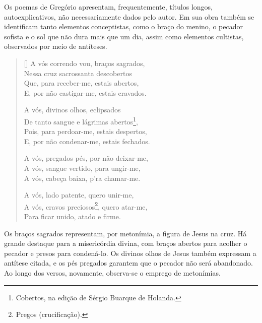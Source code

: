 \documentclass[12pt]{book}
\begin{document}
			\par Os poemas de Gregório apresentam, frequentemente, títulos longos, autoexplicativos, não necessariamente dados pelo autor. Em sua obra também se identificam tanto elementos conceptistas, como o braço do menino, o pecador sofista e o sol que não dura mais que um dia, assim como elementos cultistas, observados por meio de antíteses.
			\settowidth{\versewidth}{Nessa cruz sacrossanta descobertos}
			\begin{verse}[\versewidth]
				A vós correndo vou, braços sagrados, \\
				Nessa cruz sacrossanta descobertos \\
				Que, para receber-me, estais abertos, \\
				E, por não castigar-me, estais cravados.

				A vós, divinos olhos, eclipsados \\
				De tanto sangue e lágrimas abertos\footnote{Cobertos, na edição de Sérgio Buarque de Holanda.}, \\
				Pois, para perdoar-me, estais despertos, \\
				E, por não condenar-me, estais fechados.
				
				A vós, pregados pés, por não deixar-me, \\
				A vós, sangue vertido, para ungir-me, \\
				A vós, cabeça baixa, p'ra chamar-me.
				
				A vós, lado patente, quero unir-me, \\
				A vós, cravos preciosos\footnote{Pregos (crucificação).}, quero atar-me, \\
				Para ficar unido, atado e firme. \\
			\end{verse}
			\par Os braços sagrados representam, por metonímia, a figura de Jesus na cruz. Há grande destaque para a misericórdia divina, com braços abertos para acolher o pecador e presos para condená-lo. Os divinos olhos de Jesus também expressam a antítese citada, e os pés pregados garantem que o pecador não será abandonado. Ao longo dos versos, novamente, observa-se o emprego de metonímias.
			\settowidth{\versewidth}{Depois da Luz se segue a noite escura,}
\end{document}
